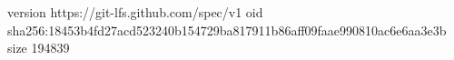 version https://git-lfs.github.com/spec/v1
oid sha256:18453b4fd27acd523240b154729ba817911b86aff09faae990810ac6e6aa3e3b
size 194839
